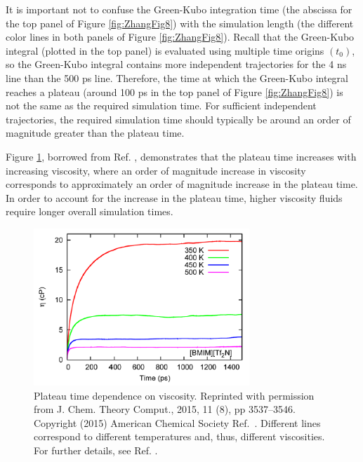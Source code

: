 \documentclass[9pt,bestpractices]{livecoms}
\begin{document}
It is important not to confuse the Green-Kubo integration time (the abscissa for the top panel of Figure \ref{fig:ZhangFig8}) with the simulation length (the different color lines in both panels of Figure \ref{fig:ZhangFig8}). Recall that the Green-Kubo integral (plotted in the top panel) is evaluated using multiple time origins $(t_0)$, so the Green-Kubo integral contains more independent trajectories for the 4 ns line than the 500 ps line. Therefore, the time at which the Green-Kubo integral reaches a plateau (around 100 ps in the top panel of Figure \ref{fig:ZhangFig8}) is not the same as the required simulation time. For sufficient independent trajectories, the required simulation time should typically be around an order of magnitude greater than the plateau time.

Figure \ref{fig:ZhangFig10}, borrowed from Ref. \cite{Zhang2015}, demonstrates that the plateau time increases with increasing viscosity, where an order of magnitude increase in viscosity corresponds to approximately an order of magnitude increase in the plateau time. In order to account for the increase in the plateau time, higher viscosity fluids require longer overall simulation times.

\begin{figure}[htb!]
	\centering
	\includegraphics[width=3.2in]{ZhangFig10.png}
	\caption{Plateau time dependence on viscosity. Reprinted with permission from J. Chem. Theory Comput., 2015, 11 (8), pp 3537–3546. Copyright (2015) American Chemical Society Ref.\ \cite{Zhang2015}. Different lines correspond to different temperatures and, thus, different viscosities. For further details, see Ref. \cite{Zhang2015}.}
	\label{fig:ZhangFig10}
\end{figure}


\end{document}
